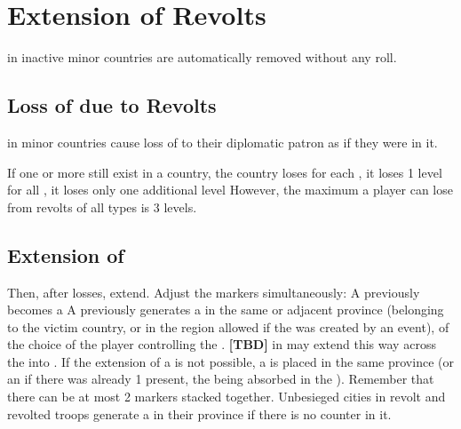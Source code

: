 \section{Extension of Revolts}

\aparag \REVOLT in inactive minor countries are automatically removed without
any roll.


\subsection{Loss of \STAB due to Revolts}
\label{chRedep:Revolts Stability}
\aparag [TBD] \REVOLT in minor countries cause loss of \STAB to their
diplomatic patron as if they were in it.

\aparag If one or more \REVOLT still exist in a country, the country loses
\STAB
\bparag for each \REVOLT\faceplus, it loses 1 \STAB level
\bparag for all \REVOLT\facemoins, it loses only one additional \STAB level
\aparag However, the maximum a player can lose from revolts of all types is 3
\STAB levels.


\subsection{Extension of \REVOLT}
\label{chRedep:Extension Revolts}
\aparag Then, after \STAB losses, \REVOLT extend. Adjust the \REVOLT markers
simultaneously:
\bparag A previously \REVOLT\facemoins becomes a \REVOLT\faceplus
\bparag A previously \REVOLT\faceplus generates a \REVOLT\facemoins in the
same or adjacent province (belonging to the victim country, or in the region
allowed if the \REVOLT was created by an event), of the choice of the player
controlling the \REVOLT.
\bparag \textbf{[TBD]} \REVOLT in \regionIrlande may extend this way across
the \seazoneMan into \ANG.
\bparag If the extension of a \REVOLT\faceplus is not possible, a \REVOLT \LD
is placed in the same province (or an \ARMY\facemoins if there was already 1
\REVOLT \LD present, the \LD being absorbed in the \ARMY).
\bparag Remember that there can be at most 2 \REVOLT markers stacked together.
\bparag Unbesieged cities in revolt and revolted troops generate a
\REVOLT\facemoins in their province if there is no \REVOLT counter in it.

